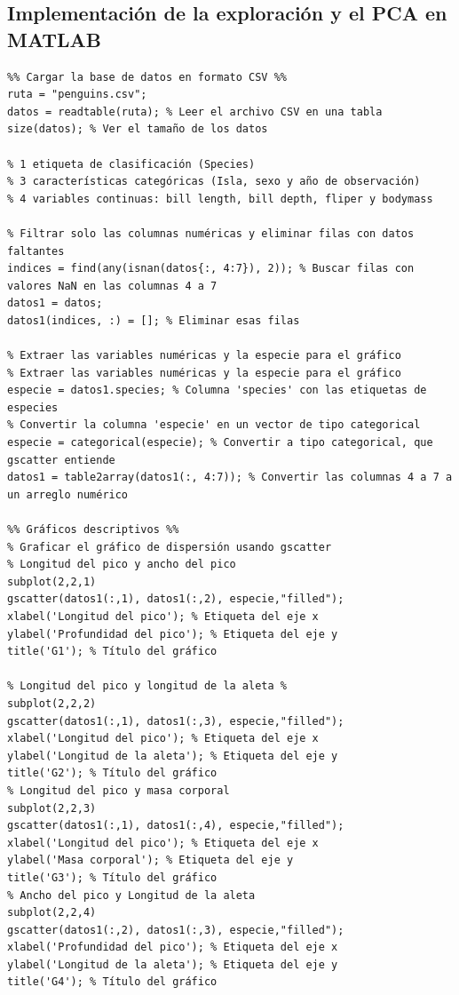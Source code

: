 \documentclass[11pt, letterpaper]{article}
\begin{document}
\subsection{Implementación de la exploración y el PCA en MATLAB}
\begin{verbatim}
%% Cargar la base de datos en formato CSV %%
ruta = "penguins.csv";
datos = readtable(ruta); % Leer el archivo CSV en una tabla
size(datos); % Ver el tamaño de los datos

% 1 etiqueta de clasificación (Species)
% 3 características categóricas (Isla, sexo y año de observación)
% 4 variables continuas: bill length, bill depth, fliper y bodymass

% Filtrar solo las columnas numéricas y eliminar filas con datos faltantes
indices = find(any(isnan(datos{:, 4:7}), 2)); % Buscar filas con valores NaN en las columnas 4 a 7
datos1 = datos;
datos1(indices, :) = []; % Eliminar esas filas

% Extraer las variables numéricas y la especie para el gráfico
% Extraer las variables numéricas y la especie para el gráfico
especie = datos1.species; % Columna 'species' con las etiquetas de especies
% Convertir la columna 'especie' en un vector de tipo categorical
especie = categorical(especie); % Convertir a tipo categorical, que gscatter entiende
datos1 = table2array(datos1(:, 4:7)); % Convertir las columnas 4 a 7 a un arreglo numérico

%% Gráficos descriptivos %%
% Graficar el gráfico de dispersión usando gscatter
% Longitud del pico y ancho del pico
subplot(2,2,1)
gscatter(datos1(:,1), datos1(:,2), especie,"filled"); 
xlabel('Longitud del pico'); % Etiqueta del eje x
ylabel('Profundidad del pico'); % Etiqueta del eje y
title('G1'); % Título del gráfico

% Longitud del pico y longitud de la aleta %
subplot(2,2,2)
gscatter(datos1(:,1), datos1(:,3), especie,"filled");
xlabel('Longitud del pico'); % Etiqueta del eje x
ylabel('Longitud de la aleta'); % Etiqueta del eje y
title('G2'); % Título del gráfico
% Longitud del pico y masa corporal
subplot(2,2,3)
gscatter(datos1(:,1), datos1(:,4), especie,"filled");
xlabel('Longitud del pico'); % Etiqueta del eje x
ylabel('Masa corporal'); % Etiqueta del eje y
title('G3'); % Título del gráfico
% Ancho del pico y Longitud de la aleta
subplot(2,2,4)
gscatter(datos1(:,2), datos1(:,3), especie,"filled");
xlabel('Profundidad del pico'); % Etiqueta del eje x
ylabel('Longitud de la aleta'); % Etiqueta del eje y
title('G4'); % Título del gráfico


\end{verbatim}
\end{document}
